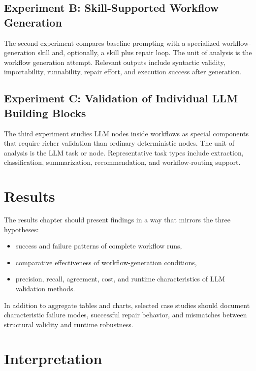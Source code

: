 \documentclass[12pt,a4paper]{article}
\begin{document}
\subsection{Experiment B: Skill-Supported Workflow Generation}

The second experiment compares baseline prompting with a specialized workflow-generation skill and, optionally, a skill plus repair loop. The unit of analysis is the workflow generation attempt. Relevant outputs include syntactic validity, importability, runnability, repair effort, and execution success after generation.

\subsection{Experiment C: Validation of Individual LLM Building Blocks}

The third experiment studies LLM nodes inside workflows as special components that require richer validation than ordinary deterministic nodes. The unit of analysis is the LLM task or node. Representative task types include extraction, classification, summarization, recommendation, and workflow-routing support.

\section{Results}

The results chapter should present findings in a way that mirrors the three hypotheses:

\begin{itemize}[leftmargin=*]
  \item success and failure patterns of complete workflow runs,
  \item comparative effectiveness of workflow-generation conditions,
  \item precision, recall, agreement, cost, and runtime characteristics of LLM validation methods.
\end{itemize}

In addition to aggregate tables and charts, selected case studies should document characteristic failure modes, successful repair behavior, and mismatches between structural validity and runtime robustness.

\section{Interpretation}
\end{document}
